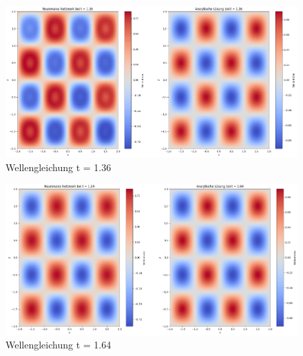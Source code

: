\begin{figure}
    \centering
    \includegraphics[width=\textwidth]{papers/neuronal/images/prediction_wave_t136.png}
    \caption{Wellengleichung t = 1.36}
    \label{fig:wellen_t136}
\end{figure}
\begin{figure}
    \centering
    \includegraphics[width=\textwidth]{papers/neuronal/images/prediction_wave_t164.png}
    \caption{Wellengleichung t = 1.64}
    \label{fig:wellen_t164}
\end{figure}


